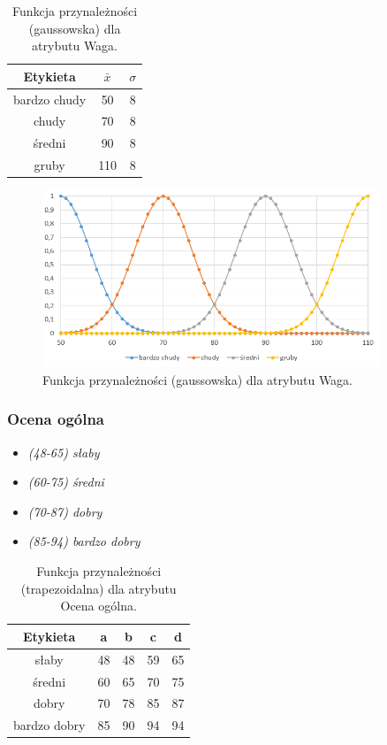\documentclass{classrep}
\begin{document}
	\begin{table}[h!]
		\centering
		\begin{tabular} {c c c}
			\hline
			\textbf{Etykieta} & \textbf{$\bar{x}$} & \textbf{$\sigma$} \\ [0.5ex] 
			\hline	
			\hline 
			bardzo chudy & 50 & 8  \\
			chudy & 70 & 8  \\
			średni & 90 & 8  \\
			gruby & 110 & 8  \\
			\hline
		\end{tabular}
		\caption{Funkcja przynależności (gaussowska) dla atrybutu Waga. }
		\label{tabelaWaga}
	\end{table}
	
	\begin{figure}[h!]
		\centering
		\includegraphics[width=0.9\textwidth]{zmienne/3.png}
		\caption{Funkcja przynależności (gaussowska) dla atrybutu Waga.}
		\label{wykresWaga}
	\end{figure}
	
	\newpage
	\subsubsection{Ocena ogólna}
	\begin{itemize}
		\item \textsl{(48-65) słaby}
		\item \textsl{(60-75) średni}
		\item \textsl{(70-87) dobry}
		\item \textsl{(85-94) bardzo dobry}
	\end{itemize}
	
	\begin{table}[h!]
		\centering
		\begin{tabular} {c c c c c}
			\hline
			\textbf{Etykieta} & \textbf{a} & \textbf{b} & \textbf{c} & \textbf{d} \\ [0.5ex] 
			\hline	
			\hline 
			słaby & 48 & 48 & 59 & 65  \\
			średni & 60 & 65 & 70 & 75  \\
			dobry & 70 & 78 & 85 & 87  \\
			bardzo dobry & 85 & 90 & 94 & 94  \\
			\hline
		\end{tabular}
		\caption{Funkcja przynależności (trapezoidalna) dla atrybutu Ocena ogólna. }
		\label{tabelaOverall}
	\end{table}
	
\end{document}
